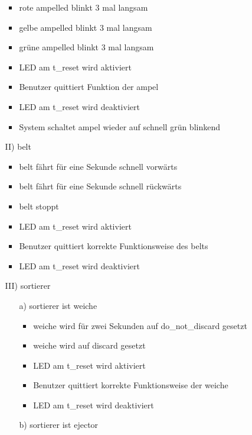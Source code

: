 \begin{enumerate}
\begin{enumerate}
\begin{itemize}
            \item rote \gls{ampelled} blinkt 3 mal langsam
            \item gelbe \gls{ampelled} blinkt 3 mal langsam
            \item grüne \gls{ampelled} blinkt 3 mal langsam
            \item LED am \gls{t_reset} wird aktiviert
            \item Benutzer quittiert Funktion der \gls{ampel}
            \item LED am \gls{t_reset} wird deaktiviert
            \item System schaltet \gls{ampel} wieder auf schnell grün blinkend
        \end{itemize}
        \item[II)] \Gls{belt}
        \begin{itemize}
            \item \Gls{belt} fährt für eine Sekunde schnell vorwärts
            \item \Gls{belt} fährt für eine Sekunde schnell rückwärts
            \item \Gls{belt} stoppt
            \item LED am \gls{t_reset} wird aktiviert
            \item Benutzer quittiert korrekte Funktionsweise des \gls{belt}s
            \item LED am \gls{t_reset} wird deaktiviert
        \end{itemize}
        \item[III)] \Gls{sortierer}
        \begin{enumerate}
            \item[a)] \Gls{sortierer} ist \gls{weiche}
            \begin{itemize}
                \item \gls{weiche} wird für zwei Sekunden auf \gls{do_not_discard} gesetzt
                \item \gls{weiche} wird auf \gls{discard} gesetzt
                \item LED am \gls{t_reset} wird aktiviert
                \item Benutzer quittiert korrekte Funktionsweise der \gls{weiche}
                \item LED am \gls{t_reset} wird deaktiviert
            \end{itemize}
            \item[b)] \gls{sortierer} ist \gls{ejector}
            \begin{itemize}

\end{itemize}
\end{enumerate}
\end{enumerate}
\end{enumerate}
